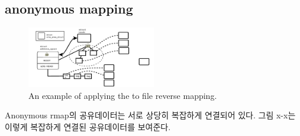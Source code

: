 


\subsection{anonymous mapping}

\begin{figure}[tb]
  \begin{center}
     \includegraphics[width=0.5\textwidth,height=0.5\textheight,keepaspectratio]{fig/anon_vma}
  \end{center}
  \caption{An example of applying the  to file reverse mapping. }
  \label{fig:deferu2}
\end{figure}


Anonymous rmap의 공유데이터는 서로 상당히 복잡하게 연결되어 있다.
그림 x-x는 이렇게 복잡하게 연결된 공유데이터를 보여준다. 





